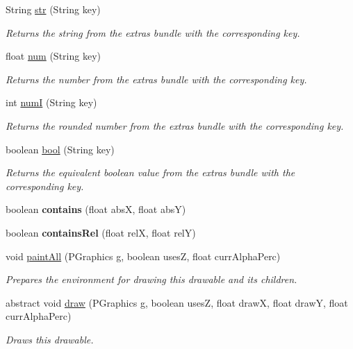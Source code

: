 \begin{DoxyCompactItemize}
String \hyperlink{classhype_1_1drawable_1_1_h_drawable_a0d2393ad2936ee21fbb73fe8044f8c03}{str} (String key)
\begin{DoxyCompactList}\small\item\em Returns the string from the {\itshape extras bundle} with the corresponding key. \end{DoxyCompactList}\item 
float \hyperlink{classhype_1_1drawable_1_1_h_drawable_aaafb5307820159466ebf60658c7a325d}{num} (String key)
\begin{DoxyCompactList}\small\item\em Returns the number from the {\itshape extras bundle} with the corresponding key. \end{DoxyCompactList}\item 
int \hyperlink{classhype_1_1drawable_1_1_h_drawable_a78a4cb7304e24e1706d9f23d0a387b43}{num\-I} (String key)
\begin{DoxyCompactList}\small\item\em Returns the rounded number from the {\itshape extras bundle} with the corresponding key. \end{DoxyCompactList}\item 
boolean \hyperlink{classhype_1_1drawable_1_1_h_drawable_a138a8d2253dbfccb39889cb01b452f7c}{bool} (String key)
\begin{DoxyCompactList}\small\item\em Returns the equivalent boolean value from the {\itshape extras bundle} with the corresponding key. \end{DoxyCompactList}\item 
\hypertarget{classhype_1_1drawable_1_1_h_drawable_a6662671b3f2c3f96cdd8883e0eb21fd6}{boolean {\bfseries contains} (float abs\-X, float abs\-Y)}\label{classhype_1_1drawable_1_1_h_drawable_a6662671b3f2c3f96cdd8883e0eb21fd6}

\item 
\hypertarget{classhype_1_1drawable_1_1_h_drawable_a40eaa02f8f52fc6891d77affe8b8f146}{boolean {\bfseries contains\-Rel} (float rel\-X, float rel\-Y)}\label{classhype_1_1drawable_1_1_h_drawable_a40eaa02f8f52fc6891d77affe8b8f146}

\item 
void \hyperlink{classhype_1_1drawable_1_1_h_drawable_a54e5a75afb23f49b37ce769a11d10fb0}{paint\-All} (P\-Graphics g, boolean uses\-Z, float curr\-Alpha\-Perc)
\begin{DoxyCompactList}\small\item\em Prepares the environment for drawing this drawable and its children. \end{DoxyCompactList}\item 
abstract void \hyperlink{classhype_1_1drawable_1_1_h_drawable_a8e0af2cfaa89a93b3dab6b5f0ecdf964}{draw} (P\-Graphics g, boolean uses\-Z, float draw\-X, float draw\-Y, float curr\-Alpha\-Perc)
\begin{DoxyCompactList}\small\item\em Draws this drawable. \end{DoxyCompactList}\end{DoxyCompactItemize}
